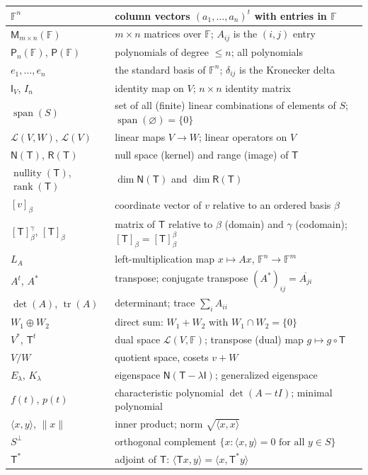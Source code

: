 \documentclass[12pt]{article}
\theoremstyle{definition}
\theoremstyle{remark}
\newcommand{\F}{\mathbb{F}}
\newcommand{\N}{\mathsf{N}}
\newcommand{\Rg}{\mathsf{R}}
\newcommand{\Lin}{\mathcal{L}}
\newcommand{\M}{\mathsf{M}}
\newcommand{\Poly}{\mathsf{P}}
\newcommand{\T}{\mathsf{T}}
\newcommand{\I}{\mathsf{I}}
\newcommand{\ip}[2]{\langle #1,#2\rangle}
\newcommand{\norm}[1]{\lVert #1\rVert}
\DeclareMathOperator{\spn}{span}
\DeclareMathOperator{\rank}{rank}
\DeclareMathOperator{\nullity}{nullity}
\DeclareMathOperator{\tr}{tr}
\renewcommand{\det}{\operatorname{det}}
\begin{document}
\renewcommand{\arraystretch}{1.18}
\begin{tabularx}{\linewidth}{|l|X|}
\hline
$\F^n$ & column vectors $(a_1,\dots,a_n)^{t}$ with entries in $\F$ \\ \hline
$\M_{m\times n}(\F)$ & $m\times n$ matrices over $\F$; $A_{ij}$ is the $(i,j)$ entry \\ \hline
$\Poly_n(\F)$, $\Poly(\F)$ & polynomials of degree $\le n$; all polynomials \\ \hline
$e_1,\dots,e_n$ & the standard basis of $\F^n$; $\delta_{ij}$ is the Kronecker delta \\ \hline
$\I_V$, $I_n$ & identity map on $V$; $n\times n$ identity matrix \\ \hline
$\spn(S)$ & set of all (finite) linear combinations of elements of $S$; $\spn(\varnothing)=\{0\}$ \\ \hline
$\Lin(V,W)$, $\Lin(V)$ & linear maps $V\to W$; linear operators on $V$ \\ \hline
$\N(\T)$, $\Rg(\T)$ & null space (kernel) and range (image) of $\T$ \\ \hline
$\nullity(\T)$, $\rank(\T)$ & $\dim\N(\T)$ and $\dim\Rg(\T)$ \\ \hline
$[v]_\beta$ & coordinate vector of $v$ relative to an ordered basis $\beta$ \\ \hline
$[\T]_\beta^\gamma$, $[\T]_\beta$ & matrix of $\T$ relative to $\beta$ (domain) and $\gamma$ (codomain); $[\T]_\beta=[\T]_\beta^\beta$ \\ \hline
$L_A$ & left-multiplication map $x\mapsto Ax$, $\F^n\to\F^m$ \\ \hline
$A^{t}$, $A^{*}$ & transpose; conjugate transpose $(A^*)_{ij}=\overline{A_{ji}}$ \\ \hline
$\det(A)$, $\tr(A)$ & determinant; trace $\sum_i A_{ii}$ \\ \hline
$W_1\oplus W_2$ & direct sum: $W_1+W_2$ with $W_1\cap W_2=\{0\}$ \\ \hline
$V^{*}$, $\T^{t}$ & dual space $\Lin(V,\F)$; transpose (dual) map $g\mapsto g\circ \T$ \\ \hline
$V/W$ & quotient space, cosets $v+W$ \\ \hline
$E_\lambda$, $K_\lambda$ & eigenspace $\N(\T-\lambda\I)$; generalized eigenspace \\ \hline
$f(t)$, $p(t)$ & characteristic polynomial $\det(A-tI)$; minimal polynomial \\ \hline
$\ip{x}{y}$, $\norm{x}$ & inner product; norm $\sqrt{\ip{x}{x}}$ \\ \hline
$S^{\perp}$ & orthogonal complement $\{x:\ip{x}{y}=0 \text{ for all } y\in S\}$ \\ \hline
$\T^{*}$ & adjoint of $\T$: $\ip{\T x}{y}=\ip{x}{\T^* y}$ \\ \hline
\end{tabularx}
\end{document}
